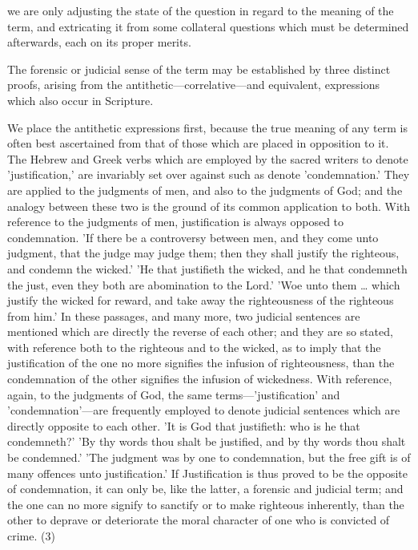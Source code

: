 \documentclass[
]{book}
\begin{document}
we are only adjusting the state of the question in regard to the meaning of the term, and extricating it from some collateral questions which must be determined afterwards, each on its proper merits.

The forensic or judicial sense of the term may be established by three distinct proofs, arising from the antithetic---correlative---and equivalent, expressions which also occur in Scripture.

We place the antithetic expressions first, because the true meaning of any term is often best ascertained from that of those which are placed in opposition to it. The Hebrew and Greek verbs which are employed by the sacred writers to denote 'justification,' are invariably set over against such as denote 'condemnation.' They are applied to the judgments of men, and also to the judgments of God; and the analogy between these two is the ground of its common application to both. With reference to the judgments of men, justification is always opposed to condemnation. 'If there be a controversy between men, and they come unto judgment, that the judge may judge them; then they shall justify the righteous, and condemn the wicked.' 'He that justifieth the wicked, and he that condemneth the just, even they both are abomination to the Lord.' 'Woe unto them \ldots{} which justify the wicked for reward, and take away the righteousness of the righteous from him.' In these passages, and many more, two judicial sentences are mentioned which are directly the reverse of each other; and they are so stated, with reference both to the righteous and to the wicked, as to imply that the justification of the one no more signifies the infusion of righteousness, than the condemnation of the other signifies the infusion of wickedness. With reference, again, to the judgments of God, the same terms---'justification' and 'condemnation'---are frequently employed to denote judicial sentences which are directly opposite to each other. 'It is God that justifieth: who is he that condemneth?' 'By thy words thou shalt be justified, and by thy words thou shalt be condemned.' 'The judgment was by one to condemnation, but the free gift is of many offences unto justification.' If Justification is thus proved to be the opposite of condemnation, it can only be, like the latter, a forensic and judicial term; and the one can no more signify to sanctify or to make righteous inherently, than the other to deprave or deteriorate the moral character of one who is convicted of crime. (3)
\end{document}

